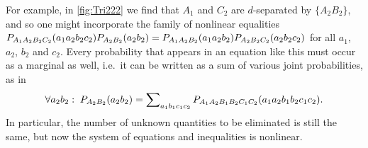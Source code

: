 For example, in \cref{fig:Tri222} we find that $A_1$ and $C_2$ are $d$-separated by $\{A_2 B_2\}$, and so one might incorporate the family of nonlinear equalities $\p[A_1 A_2 B_2 C_2]{a_1 a_2 b_2 c_2}\p[A_2 B_2]{a_2 b_2}=\p[A_1 A_2 B_2]{a_1 a_2 b_2}\p[A_2 B_2 C_2]{a_2 b_2 c_2}$ for all $a_1$, $a_2$, $b_2$ and $c_2$. Every probability that appears in an equation like this must occur as a marginal as well, i.e.~it can be written as a sum of various joint probabilities, as in
\begin{align}
\forall{a_2 b_2}:\;\pdf[A_2 B_2]{a_2 b_2} = \sum\nolimits_{a_1 b_1 c_1 c_2}\pdf[A_1 A_2 B_1 B_2 C_1 C_2]{a_1 a_2 b_1 b_2 c_1 c_2}.
\end{align}
In particular, the number of unknown quantities to be eliminated is still the same, but now the system of equations and inequalities is nonlinear. 

